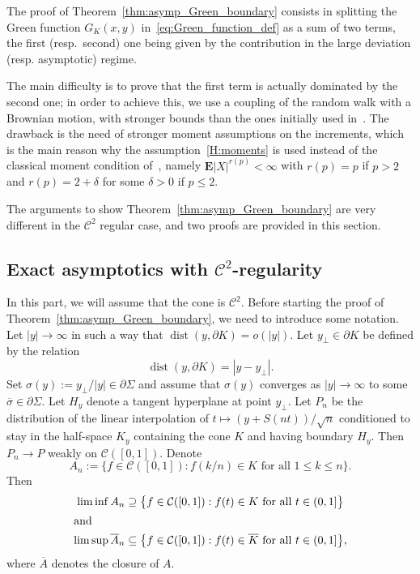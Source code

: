 \documentclass[AHL,Unicode,longabstracts,published]{cedram}
\DeclareMathOperator{\dist}{dist}
\newcommand{\clC}{\mathcal{C}}
\newcommand{\e}{\mathbf{E}}
\renewcommand{\le}{\leqslant}
\renewcommand{\leq}{\leqslant}
\begin{document}
The proof of Theorem~\ref{thm:asymp_Green_boundary} consists in splitting the Green function $G_K(x,y)$ in~\eqref{eq:Green_function_def} as a sum of two terms, the first (resp.\ second) one being given by the contribution in the large deviation (resp. asymptotic) regime.

The main difficulty is to prove that the first term is actually dominated by the second one; in order to achieve this, we use a coupling of the random walk with a Brownian motion, with stronger bounds than the ones initially used in~\cite{DeWa-15}. The drawback is the need of stronger moment assumptions on the increments, which is the main reason why the assumption~\eqref{H:moments} is used instead of the classical moment condition of~\cite{DeWa-15}, namely $\e| X|^{r(p)}<\infty$ with $r(p)=p$ if $p>2$ and $r(p)=2+\delta$ for some $\delta>0$ if $p\leq 2$.

The arguments to show Theorem~\ref{thm:asymp_Green_boundary} are very different in the $\clC^2$ regular case, and two proofs are provided in this section.

\subsection*{Exact asymptotics with \texorpdfstring{$\clC^{2}$}{C2}-regularity} In this part, we will assume that the cone is $\clC^{2}$. Before starting the proof of Theorem~\ref{thm:asymp_Green_boundary}, we need to introduce some notation. Let $| y|\to\infty$ in such a way that $\dist(y,\partial K)=o(| y|)$. Let $y_\perp\in\partial K$ be defined by the relation
\[
\dist(y,\partial K)=|y-y_\perp|.
\]
Set $\sigma(y):=y_\perp/| y|\in\partial\Sigma$ and assume that $\sigma(y)$ converges as $| y|\to\infty$ to some $\overline{\sigma}\in \partial\Sigma$. Let $H_y$ denote a tangent hyperplane at point $y_\perp.$ Let $P_n$ be the distribution of the linear interpolation of $t\mapsto (y+S(nt))/\sqrt{n}$ conditioned to stay in the half-space $K_y$ containing the cone $K$ and having boundary $H_y$. Then $P_n\to P$ weakly on $\clC([0,1])$. Denote
\[
A_n:=\big\{f\in \clC([0,1]): f(k/n)\in K\text{ for all }1\le k\le n\big\}.
\]
Then
\begin{align*}
\liminf A_n &\supseteq\big\{f\in \clC([0,1]): f(t)\in K\text{ for all }t\in(0,1]\big\}\\
\intertext{and}
\limsup \overline{A}_n &\subseteq\big\{f\in \clC([0,1]): f(t)\in \overline{K}\text{ for all }t\in(0,1]\big\},
\end{align*}
where $\overline{A}$ denotes the closure of $A$.
\end{document}
